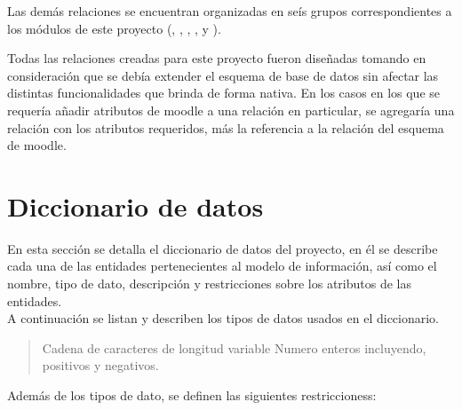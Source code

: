  \noindent Las demás relaciones se encuentran organizadas en seís grupos correspondientes
 a los módulos de este proyecto (, , ,
 ,  y ).

 \clearpage

 \noindent Todas las relaciones creadas para este proyecto fueron diseñadas tomando en
 consideración que se debía extender el esquema de base de datos sin afectar las distintas
 funcionalidades que brinda de forma nativa. En los casos en los que se requería añadir
 atributos de moodle a una relación en particular, se agregaría una relación con los atributos
 requeridos, más la referencia a la relación del esquema de moodle.


\clearpage
\section{Diccionario de datos}

 En esta sección se detalla el diccionario de datos del proyecto, en él se describe cada una
 de las entidades pertenecientes al modelo de información, así como el nombre, tipo de dato,
 descripción y restricciones sobre los atributos de las entidades.\\

 A continuación se listan y describen los tipos de
 datos usados en el diccionario.

    \begin{quote}
    \begin{bGlosario}
         Cadena de caracteres de longitud variable
                 Numero enteros incluyendo, positivos y negativos.
    \end{bGlosario}
    \end{quote}

 Además de los tipos de dato, se definen las
 siguientes restriccioness:
    
